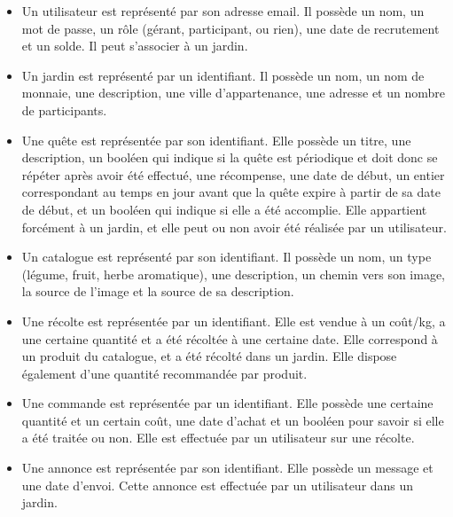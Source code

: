 \documentclass[12pt,titlepage]{report}
\begin{document}
\begin{itemize}
    \item Un utilisateur est représenté par son adresse email. Il possède un nom, un mot de passe, un rôle (gérant, participant, ou rien), une date de recrutement et un solde. Il peut s’associer à un jardin. \\

    \item Un jardin est représenté par un identifiant. Il possède un nom, un nom de monnaie, une description, une ville d’appartenance, une adresse et un nombre de participants. \\

    \item Une quête est représentée par son identifiant. Elle possède un titre, une description, un booléen qui indique si la quête est périodique et doit donc se répéter après avoir été effectué, une récompense, une date de début, un entier correspondant au temps en jour avant que la quête expire à partir de sa date de début, et un booléen qui indique si elle a été accomplie. Elle appartient forcément à un jardin, et elle peut ou non avoir été réalisée par un utilisateur.\\

    \item Un catalogue est représenté par son identifiant. Il possède un nom, un type (légume, fruit, herbe aromatique), une description, un chemin vers son image, la source de l’image et la source de sa description. \\

    \item Une récolte est représentée par un identifiant. Elle est vendue à un coût/kg, a une certaine quantité et a été récoltée à une certaine date. Elle correspond à un produit du catalogue, et a été récolté dans un jardin. Elle dispose également d'une quantité recommandée par produit. \\

    \item Une commande est représentée par un identifiant. Elle possède une certaine quantité et un certain coût, une date d’achat et un booléen pour savoir si elle a été traitée ou non. Elle est effectuée par un utilisateur sur une récolte. \\

    \item Une annonce est représentée par son identifiant. Elle possède un message et une date d’envoi. Cette annonce est effectuée par un utilisateur dans un jardin. \\
    
\end{itemize}
\end{document}
